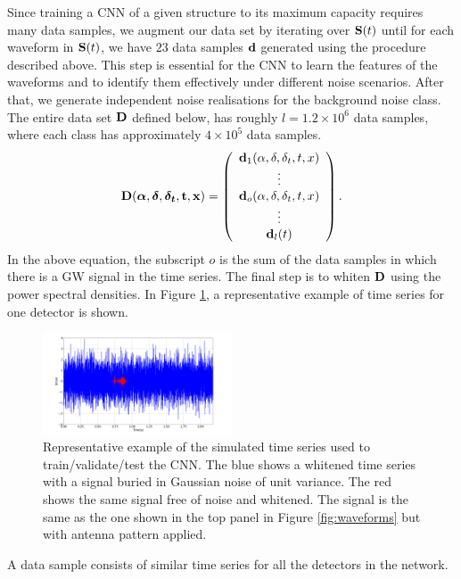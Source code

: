 \documentclass[aps,twocolumn,showpacs,groupedaddress, nofootinbib]{revtex4}  %
\begin{document}
Since training a \ac{CNN} of a given structure to its maximum capacity requires many data samples, we augment our data set by iterating over $\bold{S}(t)$ until 
for each waveform in $\bold{S}(t)$, we have $23$ data samples $\bold{d}$ generated using the procedure described above.
This step is essential for the \ac{CNN} to learn the features of the waveforms and to identify them effectively under different noise scenarios.
After that, we generate independent noise realisations for the background noise class.
The entire data set $\bold{D}$ defined below, has roughly $l = 1.2 \times 10^{6}$ data samples, where each class has approximately $4\times10^{5}$ data samples.
\begin{equation}\label{eq:finaldata}
\bold{D}(\boldsymbol{\alpha}, \boldsymbol{\delta}, \boldsymbol{\delta_t}, \bold{t}, \bold{x}) =  \left(\begin{array}{c}
\bold{d}_1(\alpha, \delta, \delta_t, t, x) \\
\vdots \\
\bold{d}_o(\alpha, \delta, \delta_t, t, x) \\
\vdots \\
\bold{d}_l(t) \\
\end{array}\right).
\end{equation}
In the above equation, the subscript $o$ is the sum of the data samples in which there is a \ac{GW} signal in the time series. 
The final step is to whiten $\bold{D}$ using the power spectral densities.
In Figure \ref{fig:sample}, a representative example  of time series for one detector is shown. 
\begin{figure}
\includegraphics[width=0.5\textwidth]{datasample.png}
\caption{Representative example of the simulated time series used to train/validate/test the \ac{CNN}.
The blue shows a whitened time series with a signal buried in Gaussian noise of unit variance.
The red shows the same signal free of noise and whitened. The signal is the same as the one shown in the top panel in Figure \ref{fig:waveforms} but with antenna pattern applied. 
\label{fig:sample}}
\end{figure}
A data sample consists of similar time series for all the detectors in the network.
\end{document}
